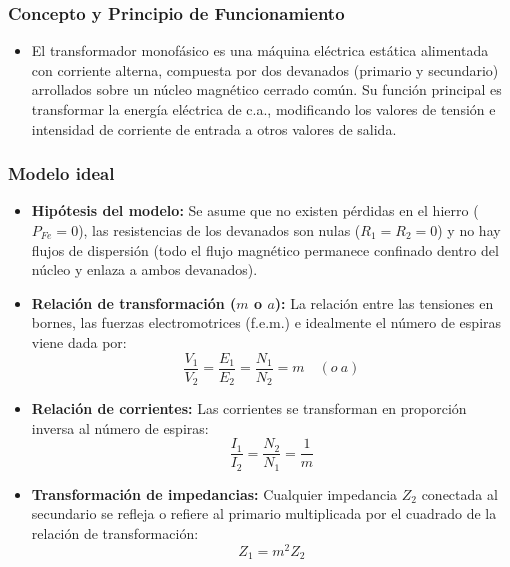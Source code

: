 \documentclass[12pt]{article}
\begin{document}
\subsubsection*{Concepto y Principio de Funcionamiento}
\begin{itemize}
    \item El transformador monof\'asico es una m\'aquina el\'ectrica est\'atica alimentada con corriente alterna, compuesta por dos devanados (primario y secundario) arrollados sobre un n\'ucleo magn\'etico cerrado com\'un. Su funci\'on principal es transformar la energ\'ia el\'ectrica de c.a., modificando los valores de tensi\'on e intensidad de corriente de entrada a otros valores de salida.
\end{itemize}

\subsubsection*{Modelo ideal}
\begin{itemize}
    \item \textbf{Hip\'otesis del modelo:} Se asume que no existen p\'erdidas en el hierro ($P_{Fe}=0$), las resistencias de los devanados son nulas ($R_1=R_2=0$) y no hay flujos de dispersi\'on (todo el flujo magn\'etico permanece confinado dentro del n\'ucleo y enlaza a ambos devanados).

    \item \textbf{Relaci\'on de transformaci\'on ($m$ o $a$):} La relaci\'on entre las tensiones en bornes, las fuerzas electromotrices (f.e.m.) e idealmente el n\'umero de espiras viene dada por:
    \[
        \frac{V_1}{V_2}=\frac{E_1}{E_2}=\frac{N_1}{N_2}=m \quad (o\ a)
    \]

    \item \textbf{Relaci\'on de corrientes:} Las corrientes se transforman en proporci\'on inversa al n\'umero de espiras:
    \[
        \frac{I_1}{I_2}=\frac{N_2}{N_1}=\frac{1}{m}
    \]

    \item \textbf{Transformaci\'on de impedancias:} Cualquier impedancia $Z_2$ conectada al secundario se refleja o refiere al primario multiplicada por el cuadrado de la relaci\'on de transformaci\'on:
    \[
        Z_1=m^2Z_2
    \]
\end{itemize}
\end{document}
